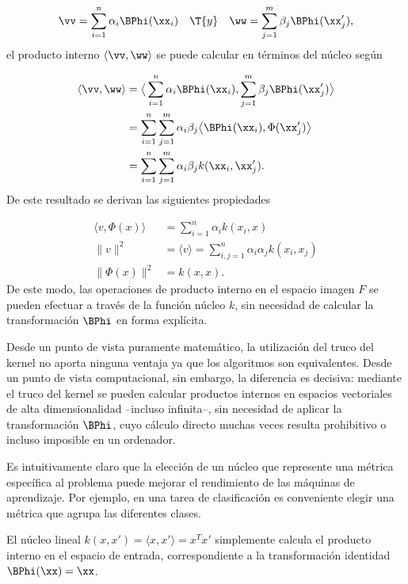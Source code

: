 \begin{align*}
  \vv=\sum_{i=1}^{n}\alpha_i\BPhi(\xx_i) \quad\T{ y }\quad
  \ww=\sum_{j=1}^{m}\beta_j\BPhi(\xx_j'),
\end{align*}
el producto interno $\langle\vv,\ww\rangle$ se puede calcular en
términos del núcleo según

\begin{align}
  \langle \vv,\ww\rangle&=\big\langle\sum_{i=1}^{n}\alpha_i\BPhi(\xx_i),
      \sum_{j=1}^{m}\beta_j\BPhi(\xx_j')\big\rangle \notag\\
    &=\sum_{i=1}^{n}\sum_{j=1}^{m}
      \alpha_i\beta_j\big\langle\BPhi(\xx_i),\Phi(\xx_j')\big\rangle\notag\\
    &=\sum_{i=1}^{n}\sum_{j=1}^{m} \alpha_i\beta_jk(\xx_i,\xx_j').
\end{align}
De este resultado se derivan las siguientes propiedades

\begin{align}
  \langle{}v,\Phi(x)\rangle &= \sum_{i=1}^{n}\alpha_ik(x_i,x) \\
  \|v\|^2 &= \langle{}v\rangle=\sum_{i,j=1}^n\alpha_i\alpha_jk(x_i,x_j)\\
  \|\Phi(x)\|^2 &=k(x,x).
\end{align}
De este modo, las operaciones de producto interno en el espacio imagen
$F$ se pueden efectuar a través de la función núcleo $k$, sin necesidad
de calcular la transformación $\BPhi$ en forma explícita.

Desde un punto de vista puramente matemático, la utilización del truco
del kernel no aporta ninguna ventaja ya que los algoritmos son
equivalentes. Desde un punto de vista computacional, sin embargo, la
diferencia es decisiva: mediante el truco del kernel se pueden
calcular productos internos en espacios vectoriales de alta
dimensionalidad --incluso infinita--, sin necesidad de aplicar la
transformación $\BPhi$, cuyo cálculo directo muchas veces resulta
prohibitivo o incluso imposible en un ordenador.

Es intuitivamente claro que la elección de un núcleo que represente
una métrica específica al problema puede mejorar el rendimiento de las
máquinas de aprendizaje. Por ejemplo, en una tarea de clasificación es
conveniente elegir una métrica que agrupa las diferentes clases.

El núcleo lineal $k(x,x')=\langle{}x,x'\rangle=x^Tx'$ simplemente
calcula el producto interno en el espacio de entrada, correspondiente
a la transformación identidad $\BPhi(\xx)=\xx$.

